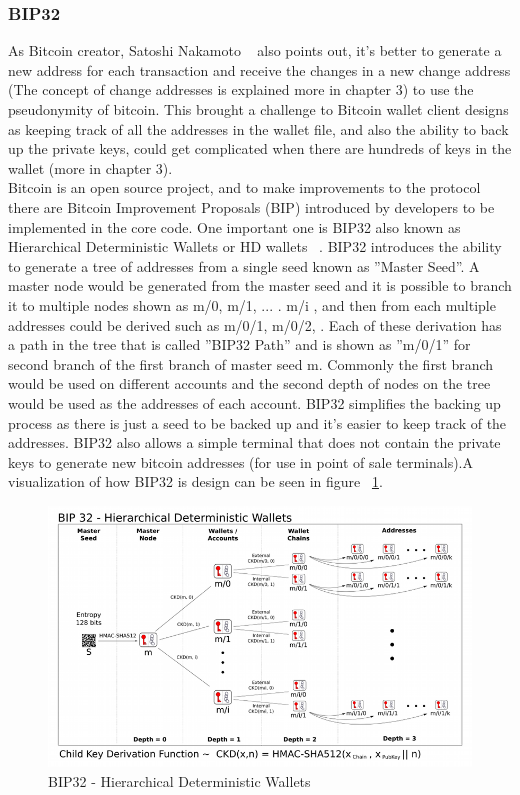 \subsubsection{BIP32} \label{BIP32}
As Bitcoin creator, Satoshi Nakamoto ~\cite{Nak08} also points out, it's better to generate a new address for each transaction and receive the changes in a new change address (The concept of change addresses is explained more in chapter 3) to use the pseudonymity of bitcoin. This brought a challenge to Bitcoin wallet client designs as keeping track of all the addresses in the wallet file, and also the ability to back up the private keys, could get complicated when there are hundreds of keys in the wallet (more in chapter 3). \\
Bitcoin is an open source project, and to make improvements to the protocol there are Bitcoin Improvement Proposals (BIP) introduced by developers to be implemented in the core code. One important one is BIP32 also known as Hierarchical Deterministic Wallets or HD wallets ~\cite{bip32}. BIP32 introduces the ability to generate a tree of addresses from a single seed known as ''Master Seed''. A master node would be generated from the master seed and it is possible to branch it to multiple nodes shown as m/0, m/1, ... . m/i , and then from each multiple addresses could be derived such as m/0/1, m/0/2, \etc. Each of these derivation has a path in the tree that is called ''BIP32 Path'' and is shown as ''m/0/1'' for second branch of the first branch of master seed m. Commonly the first branch would be used on different accounts and the second depth of nodes on the tree would be used as the addresses of each account. BIP32 simplifies the backing up process as there is just a seed to be backed up and it's easier to keep track of the addresses. BIP32 also allows a simple terminal that does not contain the private keys to generate new bitcoin addresses (for use in point of sale terminals).A visualization of how BIP32 is design can be seen in figure ~\ref{fig:bip32}.

\begin{figure}
\centering
\includegraphics[width=\linewidth]{fig/bip32derivation.png}
  \caption{BIP32 - Hierarchical Deterministic Wallets ~\cite{bip32proposal}}
\label{fig:bip32}
\end{figure}


